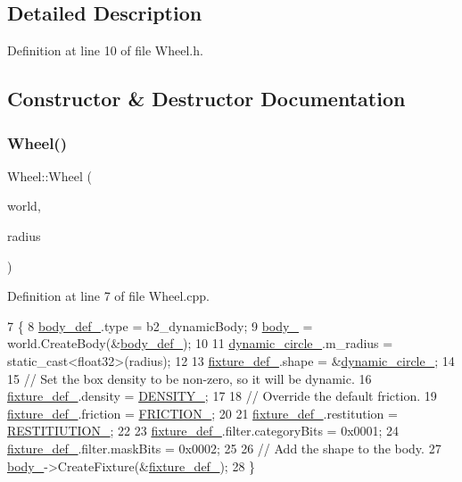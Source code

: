 \subsection{Detailed Description}


Definition at line 10 of file Wheel.\+h.



\subsection{Constructor \& Destructor Documentation}
\mbox{\label{classWheel_a80d4c116370fe8edb97f2a3381e9f55b}} 
\subsubsection{\texorpdfstring{Wheel()}{Wheel()}}
{\footnotesize\ttfamily Wheel\+::\+Wheel (\begin{DoxyParamCaption}\item[{b2\+World \&}]{world,  }\item[{double}]{radius }\end{DoxyParamCaption})}



Definition at line 7 of file Wheel.\+cpp.


\begin{DoxyCode}
7                                           \{
8     \hyperlink{classWheel_a3ab427a9baabb06def9994e54c6adea4}{body\_def\_}.type = b2\_dynamicBody;
9     \hyperlink{classWheel_a155ed4c915b672ca1dd3a6fdd51ff6e9}{body\_} = world.CreateBody(&\hyperlink{classWheel_a3ab427a9baabb06def9994e54c6adea4}{body\_def\_});
10 
11     \hyperlink{classWheel_a9464768a2f778d0da93bd53e8beb7740}{dynamic\_circle\_}.m\_radius = \textcolor{keyword}{static\_cast<}float32\textcolor{keyword}{>}(radius);
12 
13     \hyperlink{classWheel_a22109a794a3024cbc11b1e5fde8630d1}{fixture\_def\_}.shape = &\hyperlink{classWheel_a9464768a2f778d0da93bd53e8beb7740}{dynamic\_circle\_};
14 
15     \textcolor{comment}{// Set the box density to be non-zero, so it will be dynamic.}
16     \hyperlink{classWheel_a22109a794a3024cbc11b1e5fde8630d1}{fixture\_def\_}.density = \hyperlink{classWheel_afc6cf2c4e04f565ba581203878a358f0}{DENSITY\_};
17 
18     \textcolor{comment}{// Override the default friction.}
19     \hyperlink{classWheel_a22109a794a3024cbc11b1e5fde8630d1}{fixture\_def\_}.friction = \hyperlink{classWheel_a714e23dd922b96909529cc611e515603}{FRICTION\_};
20 
21     \hyperlink{classWheel_a22109a794a3024cbc11b1e5fde8630d1}{fixture\_def\_}.restitution = \hyperlink{classWheel_ad8d457ae4fcae73501f37a35f044d024}{RESTITIUTION\_};
22 
23     \hyperlink{classWheel_a22109a794a3024cbc11b1e5fde8630d1}{fixture\_def\_}.filter.categoryBits = 0x0001;
24     \hyperlink{classWheel_a22109a794a3024cbc11b1e5fde8630d1}{fixture\_def\_}.filter.maskBits = 0x0002;
25 
26     \textcolor{comment}{// Add the shape to the body.}
27     \hyperlink{classWheel_a155ed4c915b672ca1dd3a6fdd51ff6e9}{body\_}->CreateFixture(&\hyperlink{classWheel_a22109a794a3024cbc11b1e5fde8630d1}{fixture\_def\_});
28 \}
\end{DoxyCode}


